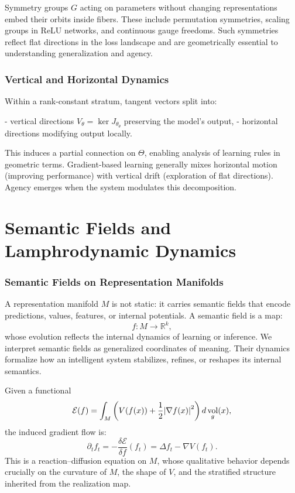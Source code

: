 \documentclass[12pt]{article}
\theoremstyle{plain}
\theoremstyle{definition}
\theoremstyle{remark}
\DeclareMathOperator{\vol}{vol}
\newcommand{\ThetaSpace}{\Theta}
\newcommand{\ParamJac}{J_\theta}
\begin{document}
Symmetry groups $G$ acting on parameters without changing representations 
embed their orbits inside fibers. These include permutation symmetries, 
scaling groups in ReLU networks, and continuous gauge freedoms. Such symmetries 
reflect flat directions in the loss landscape and are geometrically essential 
to understanding generalization and agency.

\section{Vertical and Horizontal Dynamics}

Within a rank-constant stratum, tangent vectors split into:

- vertical directions $V_\theta = \ker \ParamJac_\theta$ preserving the model’s output,  
- horizontal directions modifying output locally.

This induces a partial connection on $\ThetaSpace$, enabling analysis of 
learning rules in geometric terms. Gradient-based learning generally mixes 
horizontal motion (improving performance) with vertical drift (exploration 
of flat directions). Agency emerges when the system modulates this decomposition.

\newpage

\part{Semantic Fields and Lamphrodynamic Dynamics}

\section{Semantic Fields on Representation Manifolds}

A representation manifold $M$ is not static: it carries semantic fields that
encode predictions, values, features, or internal potentials. A semantic field
is a map:
\[
f : M \to \mathbb{R}^k,
\]
whose evolution reflects the internal dynamics of learning or inference.
We interpret semantic fields as generalized coordinates of meaning. Their 
dynamics formalize how an intelligent system stabilizes, refines, or reshapes 
its internal semantics.

Given a functional
\[
\mathcal{E}(f) 
= \int_M \left( V(f(x)) + \frac{1}{2} \abs{\nabla f(x)}^2 \right) d\vol_g(x),
\]
the induced gradient flow is:
\[
\partial_t f_t 
= - \frac{\delta \mathcal{E}}{\delta f}(f_t)
= \Delta f_t - \nabla V(f_t).
\]
This is a reaction–diffusion equation on $M$, whose qualitative behavior depends 
crucially on the curvature of $M$, the shape of $V$, and the stratified structure
inherited from the realization map.
\end{document}
